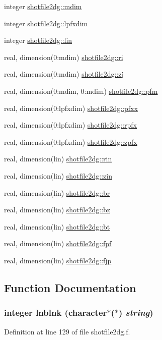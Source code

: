 \begin{CompactItemize}
\item 
integer \hyperlink{namespaceshotfile2dg_d5647f654b30284142951c13b5f6fa46}{shotfile2dg::mdim}
\item 
integer \hyperlink{namespaceshotfile2dg_d8ec7f26f5f68dace4655cd811c755a1}{shotfile2dg::lpfxdim}
\item 
integer \hyperlink{namespaceshotfile2dg_dcd8847b41f8af202e2dac58135c0113}{shotfile2dg::lin}
\item 
real, dimension(0:mdim) \hyperlink{namespaceshotfile2dg_4b7dcff54fb43627b08f2afdb56abffd}{shotfile2dg::ri}
\item 
real, dimension(0:mdim) \hyperlink{namespaceshotfile2dg_99af9f1faabd9d89aecaf6bbb80e91ba}{shotfile2dg::zj}
\item 
real, dimension(0:mdim, 0:mdim) \hyperlink{namespaceshotfile2dg_b2c08adaa9f0f8970d344c63abbf3790}{shotfile2dg::pfm}
\item 
real, dimension(0:lpfxdim) \hyperlink{namespaceshotfile2dg_331286c491d6a04e169e34eb2773ebfb}{shotfile2dg::pfxx}
\item 
real, dimension(0:lpfxdim) \hyperlink{namespaceshotfile2dg_462227f73e64d9a3ce1b6889907e3ac6}{shotfile2dg::rpfx}
\item 
real, dimension(0:lpfxdim) \hyperlink{namespaceshotfile2dg_9768ea742d6b7efdfd6e610f1e6f8914}{shotfile2dg::zpfx}
\item 
real, dimension(lin) \hyperlink{namespaceshotfile2dg_4c40d0bff2a50d6b8c210cb73852a429}{shotfile2dg::rin}
\item 
real, dimension(lin) \hyperlink{namespaceshotfile2dg_16cc50d1548b7d0f10879cf3fdc226c6}{shotfile2dg::zin}
\item 
real, dimension(lin) \hyperlink{namespaceshotfile2dg_aab63facede49889cb1dd91c24755639}{shotfile2dg::br}
\item 
real, dimension(lin) \hyperlink{namespaceshotfile2dg_bbe37b790a236f45707d1c9682d0c2d1}{shotfile2dg::bz}
\item 
real, dimension(lin) \hyperlink{namespaceshotfile2dg_286a74f661b48f942a47cd92a9b88012}{shotfile2dg::bt}
\item 
real, dimension(lin) \hyperlink{namespaceshotfile2dg_edd8eaed3b83cab69ca9550ba0792842}{shotfile2dg::fpf}
\item 
real, dimension(lin) \hyperlink{namespaceshotfile2dg_f6d890808a587cb1d0b5a509040ba1f4}{shotfile2dg::fjp}
\end{CompactItemize}


\subsection{Function Documentation}
\hypertarget{shotfile2dg_8f_a264a21cc4ba4bb23418babedd386991}{
\subsubsection[lnblnk]{\setlength{\rightskip}{0pt plus 5cm}integer lnblnk (character$\ast$($\ast$) {\em string})}}
\label{shotfile2dg_8f_a264a21cc4ba4bb23418babedd386991}




Definition at line 129 of file shotfile2dg.f.
